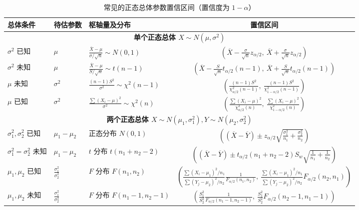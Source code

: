 \documentclass[lang=cn,11pt]{elegantbook}
\begin{document}
\begin{table}[htbp]
\centering
\caption{常见的正态总体参数置信区间（置信度为 $1-\alpha$）}
\label{tab:confidence_intervals}
\renewcommand{\arraystretch}{1.5}
\begin{tabular}{lllc}
\toprule
\textbf{总体条件} & \textbf{待估参数} & \textbf{枢轴量及分布} & \textbf{置信区间} \\
\midrule
\multicolumn{4}{c}{\textbf{单个正态总体 $X \sim N(\mu, \sigma^2)$}} \\
\midrule
$\sigma^2$ 已知 & $\mu$ & $\frac{\overline{X}-\mu}{\sigma/\sqrt{n}} \sim N(0,1)$ & $\left(\overline{X}-\frac{\sigma}{\sqrt{n}}z_{\alpha/2},\ \overline{X}+\frac{\sigma}{\sqrt{n}}z_{\alpha/2}\right)$ \\
$\sigma^2$ 未知 & $\mu$ & $\frac{\overline{X}-\mu}{S/\sqrt{n}} \sim t(n-1)$ & $\left(\overline{X}-\frac{S}{\sqrt{n}}t_{\alpha/2}(n-1),\ \overline{X}+\frac{S}{\sqrt{n}}t_{\alpha/2}(n-1)\right)$ \\
$\mu$ 未知 & $\sigma^2$ & $\frac{(n-1)S^2}{\sigma^2} \sim \chi^2(n-1)$ & $\left(\frac{(n-1)S^2}{\chi^2_{\alpha/2}(n-1)},\ \frac{(n-1)S^2}{\chi^2_{1-\alpha/2}(n-1)}\right)$ \\
$\mu$ 已知 & $\sigma^2$ & $\frac{\sum(X_i-\mu)^2}{\sigma^2} \sim \chi^2(n)$ & $\left(\frac{\sum(X_i-\mu)^2}{\chi^2_{\alpha/2}(n)},\ \frac{\sum(X_i-\mu)^2}{\chi^2_{1-\alpha/2}(n)}\right)$ \\
\midrule
\multicolumn{4}{c}{\textbf{两个正态总体 $X \sim N(\mu_1, \sigma_1^2), Y \sim N(\mu_2, \sigma_2^2)$}} \\
\midrule
$\sigma_1^2,\sigma_2^2$ 已知 & $\mu_1-\mu_2$ & 正态分布 $N(0,1)$ & $\left((\overline{X}-\overline{Y}) \pm z_{\alpha/2}\sqrt{\frac{\sigma_1^2}{n_1}+\frac{\sigma_2^2}{n_2}}\right)$ \\
$\sigma_1^2=\sigma_2^2$ 未知 & $\mu_1-\mu_2$ & $t$ 分布 $t(n_1+n_2-2)$ & $\left((\overline{X}-\overline{Y}) \pm t_{\alpha/2}(n_1+n_2-2)S_w\sqrt{\frac{1}{n_1}+\frac{1}{n_2}}\right)$ \\
$\mu_1,\mu_2$ 已知 & $\frac{\sigma_1^2}{\sigma_2^2}$ & $F$ 分布 $F(n_1,n_2)$ & $\left(\frac{\sum(X_i-\mu_1)^2/n_1}{\sum(Y_j-\mu_2)^2/n_2}\frac{1}{F_{\alpha/2}(n_1,n_2)},\ \frac{\sum(X_i-\mu_1)^2/n_1}{\sum(Y_j-\mu_2)^2/n_2} F_{\alpha/2}(n_2,n_1)\right)$ \\
$\mu_1,\mu_2$ 未知 & $\frac{\sigma_1^2}{\sigma_2^2}$ & $F$ 分布 $F(n_1-1,n_2-1)$ & $\left(\frac{S_1^2}{S_2^2}\frac{1}{F_{\alpha/2}(n_1-1,n_2-1)},\ \frac{S_1^2}{S_2^2}F_{\alpha/2}(n_2-1,n_1-1)\right)$ \\
\bottomrule
\end{tabular}
\end{table}
\end{document}
